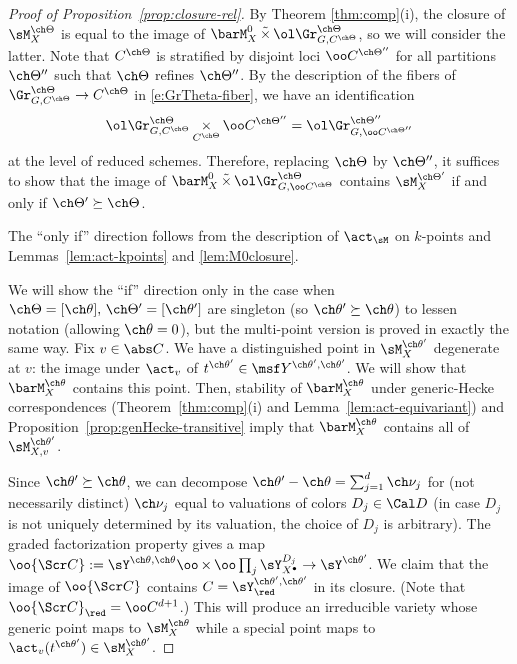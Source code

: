 \documentclass[final]{amsart}
\theoremstyle{remark}
\theoremstyle{definition}
\DeclareMathOperator*{\ttimes}{\tilde\times}
\DeclareMathOperator*{\xt}{\times}
\numberwithin{equation}{section}
\begin{document}
\begin{proof}[{Proof of Proposition~\ref{prop:closure-rel}}] 
By Theorem \ref{thm:comp}(i), the closure of $\sM^{\ch\Theta}_X$ is equal to 
the image of $\barM^0_X \ttimes \ol\Gr^{\ch\Theta}_{G,C^{\ch\Theta}}$,
so we will consider the latter. 
Note that $C^{\ch\Theta}$ is stratified by disjoint loci $\oo C^{\ch\Theta''}$ 
for all partitions $\ch\Theta''$ such that $\ch\Theta$ refines 
$\ch\Theta''$. By the description of the fibers of 
$\Gr^{\ch\Theta}_{G, C^{\ch\Theta}} \to C^{\ch\Theta}$ in 
\eqref{e:GrTheta-fiber}, we have an identification 
\[
\ol\Gr^{\ch\Theta}_{G,C^{\ch\Theta}} \xt_{C^{\ch\Theta}} \oo C^{\ch\Theta''} 
= \ol\Gr^{\ch\Theta''}_{G, \oo C^{\ch\Theta''} } 
\]
at the level of reduced schemes. Therefore, replacing $\ch\Theta$ by $\ch\Theta''$, 
it suffices to show that 
the image of $\barM_X^0 \ttimes \ol\Gr^{\ch\Theta}_{G, \oo C^{\ch\Theta}}$
contains $\sM_X^{\ch\Theta'}$ if and only if $\ch\Theta' \succeq \ch\Theta$.

The ``only if'' direction follows from the description of
$\act_\sM$ on $k$-points and Lemmas~\ref{lem:act-kpoints} 
and \ref{lem:M0closure}. 

\medskip

We will show the ``if'' direction only 
in the case when $\ch\Theta=[\ch\theta],\, \ch\Theta'=[\ch\theta']$ 
are singleton (so $\ch\theta'\succeq \ch\theta$) to lessen notation 
(allowing $\ch\theta=0$), but the multi-point version is proved in 
exactly the same way. 
Fix $v\in \abs C$. We have a distinguished point in $\sM_X^{\ch\theta'}$ degenerate
at $v$: the image under $\act_v$ of $t^{\ch\theta'} \in \msf Y^{\ch\theta',\ch\theta'}$. 
We will show that $\barM_X^{\ch\theta}$ contains this point. 
Then, stability of $\barM_X^{\ch\theta}$ under generic-Hecke correspondences 
(Theorem~\ref{thm:comp}(i) and Lemma~\ref{lem:act-equivariant}) 
and Proposition~\ref{prop:genHecke-transitive} imply that 
$\barM_X^{\ch\theta}$ contains all of $\sM_{X,v}^{\ch\theta'}$. 

\smallskip

Since $\ch\theta' \succeq \ch\theta$, we can decompose 
$\ch\theta' - \ch\theta = \sum_{j=1}^d \ch\nu_j$ for (not necessarily distinct) 
$\ch\nu_j$ equal to valuations of colors $D_j \in \Cal D$ 
(in case $D_j$ is not uniquely determined by its valuation, the choice of $D_j$ is arbitrary). 
The graded factorization property gives a map 
$\oo{\Scr C} := \sY^{\ch\theta,\ch\theta} \oo\xt \oo\prod_j \sY^{D_j}_{X^\bullet} 
\to \sY^{\ch\theta'}$. 
We claim that the image of 
$\oo{\Scr C}$ contains $C=\sY^{\ch\theta',\ch\theta'}_\red$ in its closure. 
(Note that $\oo{\Scr C}_\red = \oo C^{d+1}$.) 
This will produce an irreducible variety whose generic point maps to $\sM_X^{\ch\theta}$ 
while a special point maps to $\act_v(t^{\ch\theta'}) \in \sM_X^{\ch\theta'}$.


\end{proof}
\end{document}

